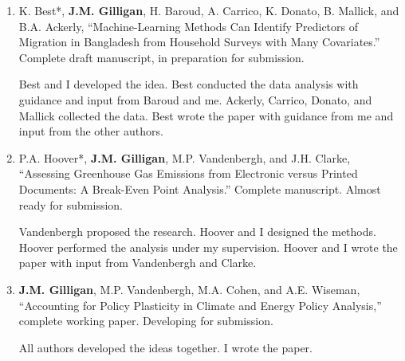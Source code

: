 %
%
\begin{enumerate}
    \item 
	K. Best*, \textbf{J.M. Gilligan}, H. Baroud, A. Carrico, K. Donato, B. Mallick, and B.A. Ackerly,
	``Machine-Learning Methods Can Identify Predictors of Migration in Bangladesh from Household Surveys with Many Covariates.''
	Complete draft manuscript, in preparation for submission.
	\begin{credit}
		Best and I developed the idea. Best conducted the data analysis with guidance and input from Baroud and me.
		Ackerly, Carrico, Donato, and Mallick collected the data.
		Best wrote the paper with guidance from me and input from the other authors.
	\end{credit}

    \item 
    P.A. Hoover*, \textbf{J.M. Gilligan}, M.P. Vandenbergh, and J.H. Clarke,
    ``Assessing Greenhouse Gas Emissions from Electronic versus Printed Documents: A Break-Even Point Analysis.''
    Complete manuscript. Almost ready for submission.
    \begin{credit}
        Vandenbergh proposed the research. Hoover and I designed the methods. Hoover performed the analysis under my supervision.
        Hoover and I wrote the paper with input from Vandenbergh and Clarke.
    \end{credit}

    \item 
    \textbf{J.M. Gilligan}, M.P. Vandenbergh, M.A. Cohen, and A.E. Wiseman, 
    ``Accounting for Policy Plasticity in Climate and Energy Policy Analysis,''
    complete working paper.
    Developing for submission.
    \begin{credit}
        All authors developed the ideas together. I wrote the paper.
    \end{credit}
    
%
\end{enumerate}
